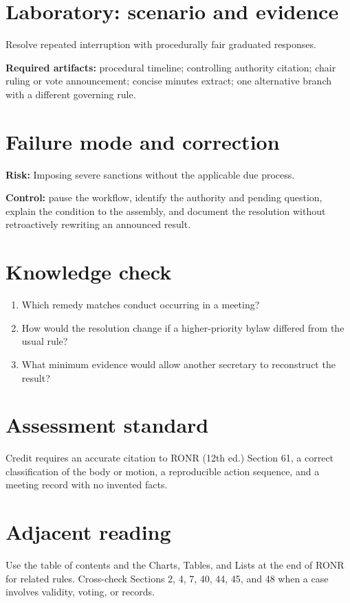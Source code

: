 \documentclass[11pt]{article}
\begin{document}
\section{Laboratory: scenario and evidence}
Resolve repeated interruption with procedurally fair graduated responses.

\textbf{Required artifacts:} procedural timeline; controlling authority citation; chair ruling or vote announcement; concise minutes extract; one alternative branch with a different governing rule.

\section{Failure mode and correction}
\textbf{Risk:} Imposing severe sanctions without the applicable due process.

\textbf{Control:} pause the workflow, identify the authority and pending question, explain the condition to the assembly, and document the resolution without retroactively rewriting an announced result.

\section{Knowledge check}
\begin{enumerate}[leftmargin=*,itemsep=4pt]
\item Which remedy matches conduct occurring in a meeting?
\item How would the resolution change if a higher-priority bylaw differed from the usual rule?
\item What minimum evidence would allow another secretary to reconstruct the result?
\end{enumerate}

\section{Assessment standard}
Credit requires an accurate citation to RONR (12th ed.) Section 61, a correct classification of the body or motion, a reproducible action sequence, and a meeting record with no invented facts.

\section{Adjacent reading}
Use the table of contents and the Charts, Tables, and Lists at the end of RONR for related rules. Cross-check Sections 2, 4, 7, 40, 44, 45, and 48 when a case involves validity, voting, or records.
\end{document}
